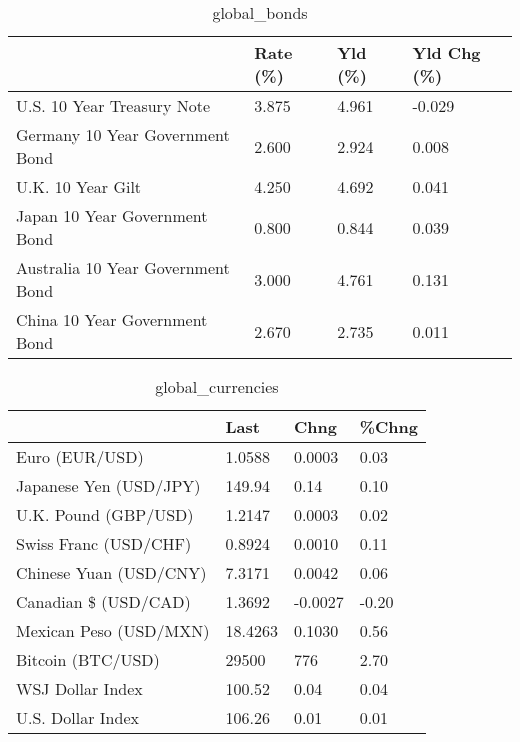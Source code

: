 \documentclass{article}%
\begin{document}
%


\begin{table}[htbp]%
\caption{global\_bonds}%
\centering%
\begin{adjustbox}{width=1\textwidth}%
\begin{tabular}{llll}
\toprule
                                  & Rate (\%) & Yld (\%) & Yld Chg (\%) \\
\midrule
       U.S. 10 Year Treasury Note &    3.875 &   4.961 &      -0.029 \\
  Germany 10 Year Government Bond &    2.600 &   2.924 &       0.008 \\
                U.K. 10 Year Gilt &    4.250 &   4.692 &       0.041 \\
    Japan 10 Year Government Bond &    0.800 &   0.844 &       0.039 \\
Australia 10 Year Government Bond &    3.000 &   4.761 &       0.131 \\
    China 10 Year Government Bond &    2.670 &   2.735 &       0.011 \\
\bottomrule
\end{tabular}
%
\end{adjustbox}%
\end{table}

%


\begin{table}[htbp]%
\caption{global\_currencies}%
\centering%
\begin{adjustbox}{width=1\textwidth}%
\begin{tabular}{llll}
\toprule
                       &    Last &    Chng & \%Chng \\
\midrule
        Euro (EUR/USD) &  1.0588 &  0.0003 &  0.03 \\
Japanese Yen (USD/JPY) &  149.94 &    0.14 &  0.10 \\
  U.K. Pound (GBP/USD) &  1.2147 &  0.0003 &  0.02 \\
 Swiss Franc (USD/CHF) &  0.8924 &  0.0010 &  0.11 \\
Chinese Yuan (USD/CNY) &  7.3171 &  0.0042 &  0.06 \\
  Canadian \$ (USD/CAD) &  1.3692 & -0.0027 & -0.20 \\
Mexican Peso (USD/MXN) & 18.4263 &  0.1030 &  0.56 \\
     Bitcoin (BTC/USD) &   29500 &     776 &  2.70 \\
      WSJ Dollar Index &  100.52 &    0.04 &  0.04 \\
     U.S. Dollar Index &  106.26 &    0.01 &  0.01 \\
\bottomrule
\end{tabular}
%
\end{adjustbox}%
\end{table}
\end{document}
